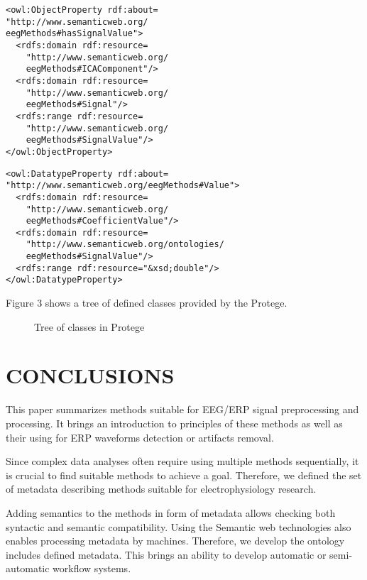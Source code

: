 \documentclass[a4paper,twoside]{article}
\begin{document}
\begin{small}
\begin{verbatim}
<owl:ObjectProperty rdf:about=
"http://www.semanticweb.org/
eegMethods#hasSignalValue">
  <rdfs:domain rdf:resource=
    "http://www.semanticweb.org/
    eegMethods#ICAComponent"/>
  <rdfs:domain rdf:resource=
    "http://www.semanticweb.org/
    eegMethods#Signal"/>
  <rdfs:range rdf:resource=
    "http://www.semanticweb.org/
    eegMethods#SignalValue"/>
</owl:ObjectProperty>
\end{verbatim}
\end{small}

\begin{small}
\begin{verbatim}
<owl:DatatypeProperty rdf:about=
"http://www.semanticweb.org/eegMethods#Value">
  <rdfs:domain rdf:resource=
    "http://www.semanticweb.org/
    eegMethods#CoefficientValue"/>
  <rdfs:domain rdf:resource=
    "http://www.semanticweb.org/ontologies/
    eegMethods#SignalValue"/>
  <rdfs:range rdf:resource="&xsd;double"/>
</owl:DatatypeProperty>
\end{verbatim}
\end{small}

\noindent Figure 3 shows a tree of defined classes provided by the Protege.

\begin{figure}[!h]

  \centering
   {}
  \caption{Tree of classes in Protege}
  \label{fig:classTree}
 \end{figure}

\section{\uppercase{Conclusions}}
\label{sec:conclusion}

\noindent This paper summarizes methods suitable for EEG/ERP signal
preprocessing and processing. It brings an introduction
to principles of these methods as well as their using
for ERP waveforms detection or artifacts removal.

Since complex data analyses often require using multiple methods sequentially, it is crucial to find suitable methods to achieve a goal. Therefore, we defined the set of metadata describing methods suitable for electrophysiology research.

Adding semantics to the methods in form of metadata allows checking both syntactic and semantic compatibility. Using the Semantic web technologies also enables processing metadata by machines. Therefore, we develop the ontology includes defined metadata. This brings an ability to develop automatic or semi-automatic workflow systems.
\end{document}
